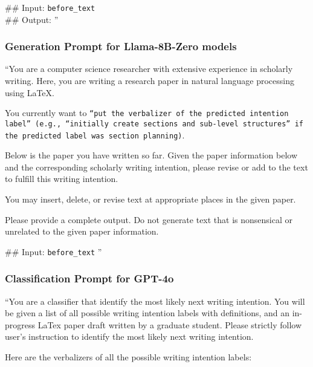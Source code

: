 \#\# Input: \texttt{{before\_text}} \\
\#\# Output: 
''

\subsubsection{Generation Prompt for Llama-8B-Zero models}

``You are a computer science researcher with extensive experience in scholarly writing. Here, you are writing a research paper in natural language processing using LaTeX.

You currently want to \texttt{{``put the verbalizer of the predicted intention label''} (e.g., ``initially create sections and sub-level structures'' if the predicted label was section planning)}. 

Below is the paper you have written so far. Given the paper information below and the corresponding scholarly writing intention, please revise or add to the text to fulfill this writing intention.

You may insert, delete, or revise text at appropriate places in the given paper.

Please provide a complete output. Do not generate text that is nonsensical or unrelated to the given paper information.

\#\# Input: \texttt{{before\_text}}
''


\subsubsection{Classification Prompt for GPT-4o}

``You are a classifier that identify the most likely next writing intention. You will be given a list of all possible writing intention labels with definitions, and an in-progress LaTex paper draft written by a graduate student. Please strictly follow user's instruction to identify the most likely next writing intention. 

Here are the verbalizers of all the possible writing intention labels:


